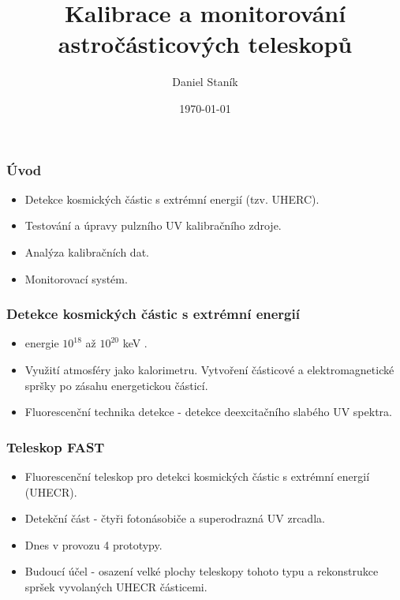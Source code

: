 \documentclass{beamer}
\title{Kalibrace a monitorování astročásticových teleskopů}
\author{Daniel Staník}
\institute{
SLO Upol}
\date{\today}
\begin{document}
\begin{frame}
\titlepage
\end{frame}


\begin{frame}
\frametitle{Úvod}
\begin{itemize}
 \item Detekce kosmických částic s extrémní energií (tzv. UHERC).
 \item Testování a úpravy pulzního UV kalibračního zdroje.
 \item Analýza kalibračních dat.
 \item Monitorovací systém.
\end{itemize}

\end{frame}



\begin{frame}
\frametitle{Detekce kosmických částic s extrémní energií}
\begin{itemize}
 \item energie $10^{18}$ až $10^{20}$ keV .
 \item Využití atmosféry jako kalorimetru. Vytvoření částicové a elektromagnetické spršky po zásahu energetickou částicí.
 \item Fluorescenční technika detekce - detekce deexcitačního slabého UV spektra.
\end{itemize}

\end{frame}





\begin{frame}
\frametitle{Teleskop FAST}
\begin{itemize}
 \item Fluorescenční teleskop pro detekci kosmických částic s extrémní energií (UHECR).
 \item Detekční část - čtyři fotonásobiče a superodrazná UV zrcadla.
 \item Dnes v provozu 4 prototypy.
 \item Budoucí účel - osazení velké plochy teleskopy tohoto typu a rekonstrukce spršek vyvolaných UHECR částicemi.
\end{itemize}

\end{frame}
\end{document}
